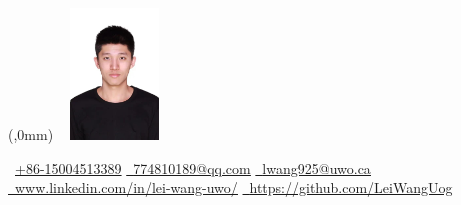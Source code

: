\documentclass{resume}
\begin{document}
    

    

\begin{textblock*}{0mm}(\paperwidth-43mm,0mm) %
    \includegraphics[width=30mm,height=35mm]{CHN/resume-master/生活照.jpg}
\end{textblock*}




 

\begin{center}
    \faPhone \ \small  \underline{+86-15004513389} \quad %
    \href{mailto:lwang925@uwo.ca}{\faEnvelope \ \underline{774810189@qq.com}} \quad %
    \href{mailto:774810189@qq.com}{\faEnvelope \ \underline{lwang925@uwo.ca}} \quad \\%
    \href{https://www.linkedin.com/in/lei-wang-uwo/}{\faLinkedin \ \underline{www.linkedin.com/in/lei-wang-uwo/}} \quad %
    \href{https://github.com/LeiWangUog/}{\faGithub \ \underline{https://github.com/LeiWangUog}} %
\end{center}
 

\vspace{-7pt}
\end{document}
